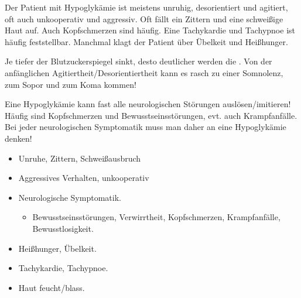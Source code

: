{
Der Patient mit Hypoglykämie ist meistens unruhig, desorientiert und agitiert,
oft auch unkooperativ und aggressiv. Oft fällt ein Zittern und eine schweißige
Haut auf. Auch Kopfschmerzen sind häufig. Eine Tachykardie und Tachypnoe ist
häufig feststellbar. Manchmal klagt der Patient über Übelkeit und Heißhunger.

Je tiefer der Blutzuckerspiegel sinkt, desto deutlicher werden die
. Von der anfänglichen
Agitiertheit/Desorientiertheit kann es rasch zu einer Somnolenz, zum Sopor und
zum Koma kommen!

Eine Hypoglykämie kann fast alle neurologischen  Störungen
aus\-lösen/imitieren! Häufig sind Kopfschmerzen und Bewusstseinsstörungen, evt.
auch Krampfanfälle. Bei jeder neurologischen Symptomatik muss man daher an eine Hypoglykämie denken!



}{
\begin{itemize}
  \item Unruhe, Zittern, Schweißausbruch
  \item Aggressives Verhalten, unkooperativ
  \item Neurologische Symptomatik.
  \begin{itemize}
    \item Bewusstseinsstörungen, Verwirrtheit, Kopfschmerzen, Krampfanfälle,
    Bewusstlosigkeit.
  \end{itemize}
  \item Heißhunger, Übelkeit.
  \item Tachykardie, Tachypnoe.
  \item Haut feucht/blass.
\end{itemize}
}{}{}{}













